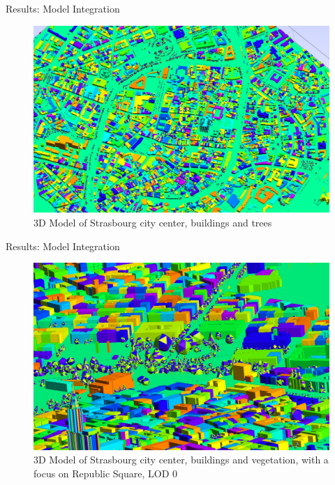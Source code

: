 \documentclass[10pt]{beamer}
\begin{document}
\begin{frame}{Results: Model Integration}
	\begin{figure}
		\centering
		\includegraphics[width=\textwidth]{images/integration_buildings_n_trees.png}
		\caption{3D Model of Strasbourg city center, buildings and trees}
		\label{fig:figure1}
	\end{figure}
\end{frame}

\begin{frame}{Results: Model Integration}
	\begin{figure}
		\centering
		\includegraphics[width=\textwidth]{images/integration_republic.png}
		\caption{3D Model of Strasbourg city center, buildings and vegetation, with a focus on Republic Square, LOD 0}
		\label{fig:figure1}
	\end{figure}
\end{frame}
\end{document}
